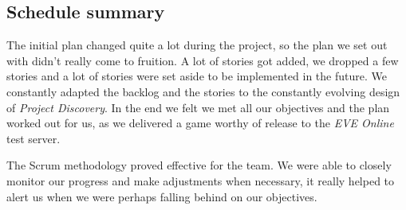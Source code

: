 \subsection{Schedule summary}
The initial plan changed quite a lot during the project, so the plan we set out with didn't really come to fruition. A lot of stories got added, we dropped a few stories and a lot of stories were set aside to be implemented in the future. We constantly adapted the backlog and the stories to the constantly evolving design of \emph{Project Discovery}. In the end we felt we met all our objectives and the plan worked out for us, as we delivered a game worthy of release to the \emph{EVE Online} test server. 

The Scrum methodology proved effective for the team. We were able to closely monitor our progress and make adjustments when necessary, it really helped to alert us when we were perhaps falling behind on our objectives.